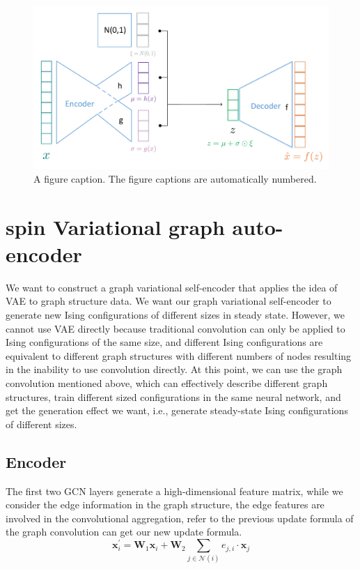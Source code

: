 \documentclass[%
reprint,
amsmath,amssymb,
aps,
]{revtex4-2}
\begin{document}
	
	\begin{figure}[b]
		\includegraphics[scale=0.3]{vae}
		\caption{\label{fig:epsart} A figure caption. The figure captions are automatically numbered.}
		\label{fig:vae}
	\end{figure}
	
	\section{spin Variational graph auto-encoder}
	We want to construct a graph variational self-encoder that applies the idea of VAE to graph structure data. We want our graph variational self-encoder to generate new Ising configurations of different sizes in steady state. However, we cannot use VAE directly because traditional convolution can only be applied to Ising configurations of the same size, and different Ising configurations are equivalent to different graph structures with different numbers of nodes resulting in the inability to use convolution directly. At this point, we can use the graph convolution mentioned above, which can effectively describe different graph structures, train different sized configurations in the same neural network, and get the generation effect we want, i.e., generate steady-state Ising configurations of different sizes.	
	\subsection{Encoder}
	The first two GCN layers generate a high-dimensional feature matrix, while we consider the edge information in the graph structure, the edge features are involved in the convolutional aggregation, refer to the previous update formula of the graph convolution can get our new update formula.
	\begin{equation}\label{upgradeFormula}
		\mathbf{x}^{\prime}_i = \mathbf{W}_1 \mathbf{x}_i + \mathbf{W}_2\sum_{j \in \mathcal{N}(i)} e_{j,i} \cdot \mathbf{x}_j
	\end{equation}
\end{document}
